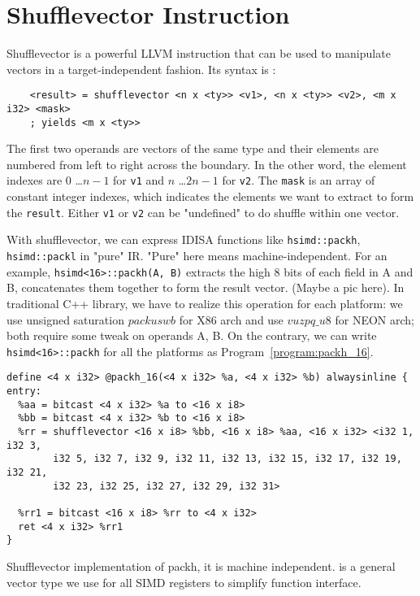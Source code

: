 %
%

\chapter{Shufflevector Instruction}
\label{three}

Shufflevector is a powerful LLVM instruction that can be used to manipulate vectors in a target-independent fashion. Its syntax is \cite{llvm_lang_ref}:

\begin{verbatim}
    <result> = shufflevector <n x <ty>> <v1>, <n x <ty>> <v2>, <m x i32> <mask>
    ; yields <m x <ty>>
\end{verbatim}

The first two operands are vectors of the same type and their elements are numbered from left to right across the boundary. In the other word, the element indexes are $0$ \ldots $n-1$ for {\tt v1} and $n$ \ldots $2n-1$ for {\tt v2}. The {\tt mask} is an array of constant integer indexes, which indicates the elements we want to extract to form the {\tt result}. Either {\tt v1} or {\tt v2} can be "undefined" to do shuffle within one vector.

With shufflevector, we can express IDISA functions like \verb|hsimd::packh|, \verb|hsimd::packl| in "pure" IR. "Pure" here means machine-independent. For an example, \verb|hsimd<16>::packh(A, B)| extracts the high 8 bits of each field in A and B, concatenates them together to form the result vector. (Maybe a pic here). In traditional C++ library, we have to realize this operation for each platform: we use unsigned saturation $packuswb$ for X86 arch and use $vuzpq\_u8$ for NEON arch; both require some tweak on operands A, B. On the contrary, we can write \verb|hsimd<16>::packh| for all the platforms as Program~\ref{program:packh_16}.

\begin{program}
\begin{verbatim}
define <4 x i32> @packh_16(<4 x i32> %a, <4 x i32> %b) alwaysinline {
entry:
  %aa = bitcast <4 x i32> %a to <16 x i8>
  %bb = bitcast <4 x i32> %b to <16 x i8>
  %rr = shufflevector <16 x i8> %bb, <16 x i8> %aa, <16 x i32> <i32 1, i32 3,
        i32 5, i32 7, i32 9, i32 11, i32 13, i32 15, i32 17, i32 19, i32 21,
        i32 23, i32 25, i32 27, i32 29, i32 31>

  %rr1 = bitcast <16 x i8> %rr to <4 x i32>
  ret <4 x i32> %rr1
}
\end{verbatim}
\caption[Shufflevector implementation of packh.]{Shufflevector implementation of packh, it is machine independent. {\tt <4 x i32>} is a general vector type we use for all SIMD registers to simplify function interface.}
\label{program:packh_16}
\end{program}

